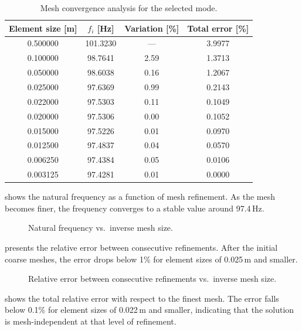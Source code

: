 \begin{table}[H]
\centering
\caption{Mesh convergence analysis for the selected mode.}
\label{tab:convergence}
\begin{tabular}{cccc}
\toprule
Element size [\si{\metre}] & $f_i$ [\si{\hertz}] & Variation [\%] & Total error [\%] \\
\midrule
0.500000 & 101.3230 & ---   & 3.9977 \\
0.100000 &  98.7641 & 2.59  & 1.3713 \\
0.050000 &  98.6038 & 0.16  & 1.2067 \\
0.025000 &  97.6369 & 0.99  & 0.2143 \\
0.022000 &  97.5303 & 0.11  & 0.1049 \\
0.020000 &  97.5306 & 0.00  & 0.1052 \\
0.015000 &  97.5226 & 0.01  & 0.0970 \\
0.012500 &  97.4837 & 0.04  & 0.0570 \\
0.006250 &  97.4384 & 0.05  & 0.0106 \\
0.003125 &  97.4281 & 0.01  & 0.0000 \\
\bottomrule
\end{tabular}
\end{table}

 shows the natural frequency as a function of mesh refinement. As the mesh becomes finer, the frequency converges to a stable value around 97.4\,Hz.

\begin{figure}[H]
    \centering
    
    \caption{Natural frequency vs.\ inverse mesh size.}
    \label{fig:convergence_frequency}
\end{figure}

 presents the relative error between consecutive refinements. After the initial coarse meshes, the error drops below 1\% for element sizes of 0.025\,m and smaller.

\begin{figure}[H]
    \centering
    
    \caption{Relative error between consecutive refinements vs.\ inverse mesh size.}
    \label{fig:convergence_error_measures}
\end{figure}

 shows the total relative error with respect to the finest mesh. The error falls below 0.1\% for element sizes of 0.022\,m and smaller, indicating that the solution is mesh-independent at that level of refinement.

